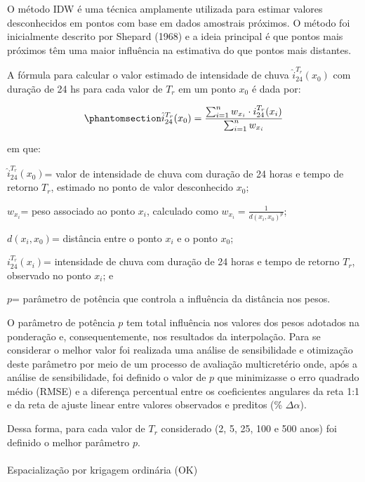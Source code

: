 \documentclass[
]{agujournal2019}
\makeatletter
\let\oldparagraph\paragraph
\renewcommand{\paragraph}{
    \@ifstar
      \xxxParagraphStar
      \xxxParagraphNoStar
  }
\newcommand{\xxxParagraphStar}[1]{\oldparagraph*{#1}\mbox{}}
\newcommand{\xxxParagraphNoStar}[1]{\oldparagraph{#1}\mbox{}}
\makeatother
\begin{document}
O método IDW é uma técnica amplamente utilizada para estimar valores
desconhecidos em pontos com base em dados amostrais próximos. O método
foi inicialmente descrito por Shepard (1968) e a ideia principal é que
pontos mais próximos têm uma maior influência na estimativa do que
pontos mais distantes.

A fórmula para calcular o valor estimado de intensidade de chuva
\(\hat i_{24}^{T_r} (x_0)\) com duração de 24 hs para cada valor de
\(T_r\) em um ponto \(x_0\) é dada por:

\begin{equation}\phantomsection\label{eq-Eq5}{
\hat i_{24}^{T_r} (x_0) = \frac{\sum_{i=1}^{n} w_{x_i} \cdot i_{24}^{T_r} (x_i)}{\sum_{i=1}^{n} w_{x_i}}
}\end{equation}

em que:

\(\hat i_{24}^{T_r} (x_0)\)= valor de intensidade de chuva com duração
de 24 horas e tempo de retorno \(T_r\), estimado no ponto de valor
desconhecido \(x_0\);

\(w_{x_i}\)= peso associado ao ponto \(x_i\), calculado como
\(w_{x_i} = \frac{1}{d(x_i,x_0)^p}\);

\(d(x_i,x_0)\)= distância entre o ponto \(x_i\) e o ponto \(x_0\);

\(i_{24}^{T_r} (x_i)\)= intensidade de chuva com duração de 24 horas e
tempo de retorno \(T_r\), observado no ponto \(x_i\); e

\(p\)= parâmetro de potência que controla a influência da distância nos
pesos.

O parâmetro de potência \(p\) tem total influência nos valores dos pesos
adotados na ponderação e, consequentemente, nos resultados da
interpolação. Para se considerar o melhor valor foi realizada uma
análise de sensibilidade e otimização deste parâmetro por meio de um
processo de avaliação multicretério onde, após a análise de
sensibilidade, foi definido o valor de \(p\) que minimizasse o erro
quadrado médio (RMSE) e a diferença percentual entre os coeficientes
angulares da reta 1:1 e da reta de ajuste linear entre valores
observados e preditos (\% \(\Delta\)\(\alpha\)).

Dessa forma, para cada valor de \(T_r\) considerado (2, 5, 25, 100 e 500
anos) foi definido o melhor parâmetro \(p\).

\paragraph{Espacialização por krigagem ordinária
(OK)}\label{espacializauxe7uxe3o-por-krigagem-ordinuxe1ria-ok}
\end{document}
